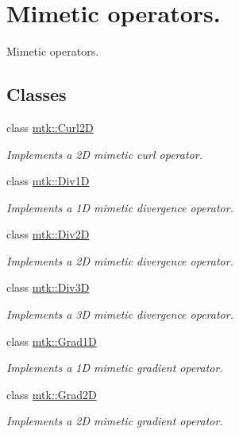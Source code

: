 \hypertarget{group__c07-mim__ops}{\section{Mimetic operators.}
\label{group__c07-mim__ops}
}


Mimetic operators.  


\subsection*{Classes}
\begin{DoxyCompactItemize}
\item 
class \hyperlink{classmtk_1_1Curl2D}{mtk\+::\+Curl2\+D}
\begin{DoxyCompactList}\small\item\em Implements a 2\+D mimetic curl operator. \end{DoxyCompactList}\item 
class \hyperlink{classmtk_1_1Div1D}{mtk\+::\+Div1\+D}
\begin{DoxyCompactList}\small\item\em Implements a 1\+D mimetic divergence operator. \end{DoxyCompactList}\item 
class \hyperlink{classmtk_1_1Div2D}{mtk\+::\+Div2\+D}
\begin{DoxyCompactList}\small\item\em Implements a 2\+D mimetic divergence operator. \end{DoxyCompactList}\item 
class \hyperlink{classmtk_1_1Div3D}{mtk\+::\+Div3\+D}
\begin{DoxyCompactList}\small\item\em Implements a 3\+D mimetic divergence operator. \end{DoxyCompactList}\item 
class \hyperlink{classmtk_1_1Grad1D}{mtk\+::\+Grad1\+D}
\begin{DoxyCompactList}\small\item\em Implements a 1\+D mimetic gradient operator. \end{DoxyCompactList}\item 
class \hyperlink{classmtk_1_1Grad2D}{mtk\+::\+Grad2\+D}
\begin{DoxyCompactList}\small\item\em Implements a 2\+D mimetic gradient operator. \end{DoxyCompactList}\item 

\end{DoxyCompactItemize}

